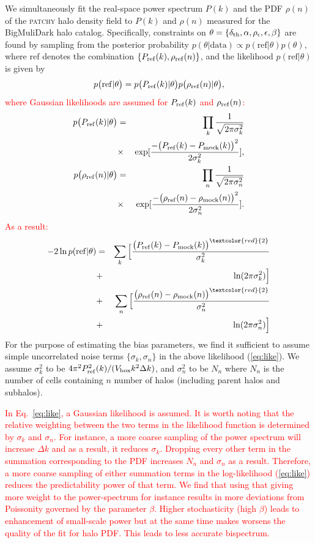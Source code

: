 \documentclass[english,usenatbib]{mn2e}
\newcommand{\tod}[1]{{\textcolor{red}{ #1}}}
\newcommand{\be}{\begin{equation}}
\newcommand{\ee}{\end{equation}}
\newcommand{\ba}{\begin{eqnarray}}
\newcommand{\ea}{\end{eqnarray}}
\begin{document}
We simultaneously fit the real-space power spectrum $P(k)$ and the PDF $\rho(n)$ of the \textsc{patchy} halo density field to $P(k)$ and $\rho(n)$ measured for the BigMuliDark halo catalog. Specifically, constraints on $\theta = \{\delta_{\rm th},\alpha, \rho_{\epsilon},\epsilon, \beta\}$ are found by sampling from the posterior probability $p(\theta|\mathrm{data}) \propto p(\mathrm{ref}|\theta)p(\theta)$, where $\mathrm{ref}$ denotes the combination $\{P_{\rm ref} (k), \rho_{\rm ref}(n)\}$, and the likelihood $p(\mathrm{ref}|\theta)$ is given by
\tod{
\be
p\big(\mathrm{ref}|\theta \big) = p\big(P_{\rm ref}(k)|\theta \big ) p\big(\rho_{\rm ref}(n)|\theta \big),
\label{eq:probs}
\ee
where Gaussian likelihoods are assumed for $P_{\rm ref}(k)$ and $\rho_{\rm ref}(n)$:
\ba
p\big(P_{\rm ref}(k)|\theta \big ) &=& \prod_{k} \frac{1}{\sqrt{2\pi\sigma_k^2}} \nonumber \\ 
&\times& \exp[\frac{-\big(P_{\rm ref}(k)-P_{\rm mock}(k)\big)^2}{2\sigma_k^{2}}],\\
p\big(\rho_{\rm ref}(n)|\theta \big ) &=& \prod_{n} \frac{1}{\sqrt{2\pi\sigma_n^2}} \nonumber \\ 
&\times& \exp[\frac{-\big(\rho_{\rm ref}(n)-\rho_{\rm mock}(n)\big)^2}{2\sigma_n^{2}}].
\ea
}
\tod{
As a result:
\ba
-2\ln p(\mathrm{ref}|\theta) &=& \sum_{k}\Big[\frac{\big(P_{\rm ref}(k)-P_{\rm mock}(k)\big)^{\tod{2}}}{\sigma^{2}_{k}}  \nonumber \\
&+& \ln(2\pi\sigma_k^2) \Big] \nonumber \\
&+& \sum_{n}\Big[\frac{\big(\rho_{\rm ref}(n)-\rho_{\rm mock}(n)\big)^{\tod{2}}}{\sigma^{2}_{n}}  \nonumber \\
&+& \ln(2\pi\sigma_n^2)\Big] \label{eq:like}
\ea
}
For the purpose of estimating the bias parameters, we find it sufficient to assume simple uncorrelated noise terms $\{\sigma_{k},\sigma_{n}\}$ in the above likelihood (\ref{eq:like}). We assume $\sigma_{k}^{2}$ to be $4\pi^{2} P_{\rm ref}^{2}(k)/(V_{\rm box}k^{2}\Delta k)$, and $\sigma_n^{2}$ to be $N_n$ where $N_n$ is the number of cells containing $n$ number of halos (including parent halos and subhalos).

\tod{In Eq.~\ref{eq:like}, a Gaussian likelihood is assumed. It is worth noting that the relative weighting between the two terms in the likelihood function is determined by $\sigma_k$ and $\sigma_n$. For instance, a more coarse sampling of the power spectrum will increase $\Delta k$ and as a result, it reduces $\sigma_k$. Dropping every other term in the summation corresponding to the PDF increases $N_n$ and $\sigma_n$ as a result. Therefore, a more coarse sampling of either summation terms in the log-likelihood (\ref{eq:like}) reduces the predictability power of that term. We find that using that giving more weight to the power-spectrum for instance results in more deviations from Poissonity governed by the parameter $\beta$. Higher stochasticity (high $\beta$) leads to enhancement of small-scale power but at the same time makes worsens the quality of the fit for halo PDF. This leads to less accurate bispectrum.} 
\end{document}
